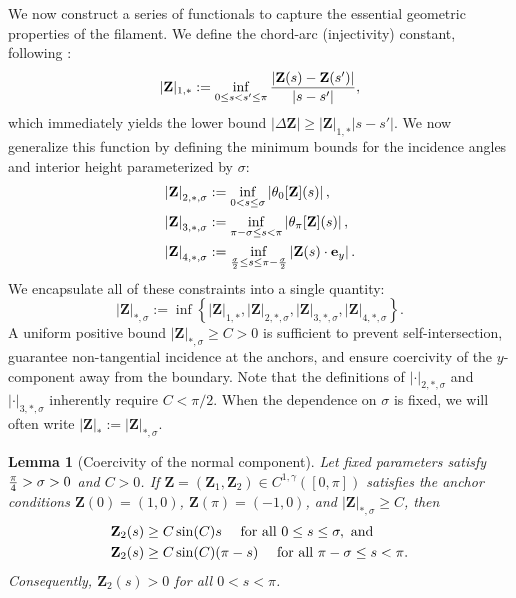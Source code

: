 \documentclass{amsart}
\newcommand{\mZ}{\mathbf{Z}}
\newtheorem{lemma}[theorem]{Lemma}
\begin{document}
We now construct a series of functionals to capture the essential geometric properties of the filament. We define the chord-arc (injectivity) constant, following \cite{bertozzi1991existence}:
\begin{align*}
    |\mZ|_{1,*} := \inf_{0\leq s < s' \leq \pi}{ |\mZ(s) - \mZ(s') | \over |s - s'|},
\end{align*}
which immediately yields the lower bound $|\Delta \mZ| \geq |\mZ|_{1,*} |s - s'|$. We now generalize this function by defining the minimum bounds for the incidence angles and interior height parameterized by $\sigma$:
\begin{align*}
\left| \mZ \right|_{2,*,\sigma} 
& := \inf_{0 < s \leq \sigma} \left| \theta_0[\mZ](s) \right|, \\
\left| \mZ \right|_{3,*,\sigma} 
& := \inf_{\pi - \sigma \leq s < \pi} \left| \theta_\pi[\mZ](s) \right|, \\
\left| \mZ \right|_{4,*,\sigma} 
& := \inf_{{\sigma \over 2} \leq s \leq \pi - {\sigma \over 2}} \left| \mZ(s) \cdot \mathbf{e}_y \right| .
\end{align*}
We encapsulate all of these constraints into a single quantity:
\begin{equation}
\left| \mZ \right|_{*,\sigma} := \inf \left\{ 
\left| \mZ \right|_{1,*},
\left| \mZ \right|_{2,*,\sigma},
\left| \mZ \right|_{3,*,\sigma},
\left| \mZ \right|_{4,*,\sigma} \right\}.
\end{equation}
A uniform positive bound $|\mZ|_{*,\sigma} \geq C > 0$ is sufficient to prevent self-intersection, guarantee non-tangential incidence at the anchors, and ensure coercivity of the $y$-component away from the boundary. Note that the definitions of $|\cdot|_{2,*,\sigma}$ and $|\cdot|_{3,*,\sigma}$ inherently require $C < \pi/2$. When the dependence on $\sigma$ is fixed, we will often write $|\mZ|_* := |\mZ|_{*,\sigma}$.

\begin{lemma}[Coercivity of the normal component] \label{l:coercivity_y}
Let fixed parameters satisfy ${\pi \over 4} > \sigma > 0$ and $C > 0$. If $\mZ = (\mZ_1,\mZ_2) \in C^{1,\gamma}([0,\pi])$ satisfies the anchor conditions $\mZ(0)=(1,0)$, $\mZ(\pi)=(-1,0)$, and $|\mZ|_{*,\sigma} \geq C$, then 
\begin{align}
\label{e:ypositve1}
\mZ_2(s) & \geq C \sin(C) s \quad \hbox{ for all } 0 \leq s \leq \sigma, \hbox{ and} \\
 \label{e:ypositve2}
\mZ_2(s) & \geq C \sin(C) ( \pi - s) \quad \hbox{ for all } \pi - \sigma \leq s <  \pi.
\end{align} 
Consequently, $\mZ_2(s) > 0$ for all $0 < s < \pi$.
\end{lemma}
\end{document}
